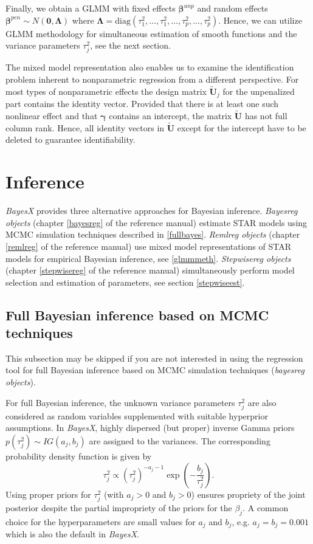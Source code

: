 \documentclass[11pt,a4paper,twoside]{bayesxarticle}
\newcommand{\diag}{\mbox{diag}}
\def \Lambdavec {\boldsymbol{\Lambda}}
\def \betavec {\boldsymbol{\beta}}
\def \gammavec {\boldsymbol{\gamma}}
\def \Uvec {\mathbf{U}}
\def \nullvec {\boldsymbol{0}}
\begin{document}
Finally, we obtain a GLMM with fixed effects $\betavec^{unp}$ and
random effects $\betavec^{pen} \sim N(\nullvec,\Lambdavec)$ where $\Lambdavec =
\diag(\tau^2_1,\dots,\tau^2_1,\dots,\tau^2_p,\dots,\tau^2_p)$.
Hence, we can utilize GLMM methodology for simultaneous estimation
of smooth functions and the variance parameters $\tau^2_j$, see the
next section.

The mixed model representation also enables us to examine the
identification problem inherent to nonparametric regression from a
different perspective. For most types of nonparametric effects the
design matrix $\tilde{\Uvec}_j$ for the unpenalized part contains the
identity vector. Provided that there is at least one such nonlinear
effect and that $\gammavec$ contains an intercept, the matrix
$\tilde{\Uvec}$ has not full column rank. Hence, all identity vectors in
$\tilde{\Uvec}$ except for the intercept have to be deleted to guarantee
identifiability.


\section{Inference}
\label{inference}

{\em BayesX} provides three alternative approaches for Bayesian
inference. {\em Bayesreg objects} (chapter \ref*{bayesreg} of the
reference manual) estimate STAR models using MCMC simulation
techniques described in \autoref{fullbayes}. {\em Remlreg objects}
(chapter \ref*{remlreg} of the reference manual) use mixed model
representations of STAR models for empirical Bayesian inference, see
\autoref{glmmmeth}. {\em Stepwisereg objects} (chapter \ref*{stepwisereg}
of the reference manual)
simultaneously perform model selection and
estimation of parameters, see section \autoref{stepwiseest}.



\subsection{Full Bayesian inference based on MCMC techniques}
\label{fullbayes}

This subsection may be skipped if you are not interested in using
the regression tool for full Bayesian inference based on MCMC
simulation techniques ({\em bayesreg objects}).

For full Bayesian inference, the unknown variance parameters
$\tau_j^2$ are also considered as random variables supplemented with
suitable hyperprior assumptions. In {\em BayesX}, highly dispersed
(but proper) inverse Gamma priors $p(\tau^2_j) \sim IG(a_j,b_j)$ are
assigned to the variances. The corresponding probability density
function is given by
$$
 \tau_j^2 \propto (\tau^2_j)^{-a_j-1}\exp\left(-\frac{b_j}{\tau^2_j}\right).
$$
Using proper priors for $\tau_j^2$ (with $a_j>0$ and $b_j>0$)
ensures propriety of the joint posterior despite the partial
impropriety of the priors for the $\beta_j$. A common choice for the
hyperparameters are small values for $a_j$ and $b_j$, e.g.
$a_j=b_j=0.001$ which is also the default in {\em BayesX}.
\end{document}

